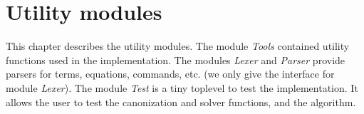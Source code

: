 
\newpage
\section*{Utility modules}

\ocwsection\label{misc}
This chapter describes the utility modules. The module \textit{Tools}
contained utility functions used in the implementation. The modules
\textit{Lexer} and \textit{Parser} provide parsers for terms,
equations, commands, etc. (we only give the interface for module
\textit{Lexer}). The module \textit{Test} is a tiny toplevel
to test the implementation. It allows the user to test the
canonization and solver functions, and the algorithm.
